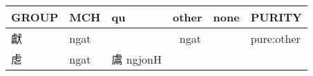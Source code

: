 \documentclass[14pt,a4paper]{scrartcl}
\begin{document}
\begin{longtable}[c]{@{}llllll@{}}
\toprule
\begin{minipage}[b]{0.14\columnwidth}\raggedright\strut
GROUP
\strut\end{minipage} &
\begin{minipage}[b]{0.14\columnwidth}\raggedright\strut
MCH
\strut\end{minipage} &
\begin{minipage}[b]{0.14\columnwidth}\raggedright\strut
qu
\strut\end{minipage} &
\begin{minipage}[b]{0.14\columnwidth}\raggedright\strut
other
\strut\end{minipage} &
\begin{minipage}[b]{0.14\columnwidth}\raggedright\strut
none
\strut\end{minipage} &
\begin{minipage}[b]{0.14\columnwidth}\raggedright\strut
PURITY
\strut\end{minipage}\tabularnewline
\midrule
\endhead
\begin{minipage}[t]{0.14\columnwidth}\raggedright\strut
獻
\strut\end{minipage} &
\begin{minipage}[t]{0.14\columnwidth}\raggedright\strut
ngat
\strut\end{minipage} &
\begin{minipage}[t]{0.14\columnwidth}\raggedright\strut
\strut\end{minipage} &
\begin{minipage}[t]{0.14\columnwidth}\raggedright\strut
𣡌 ngat
\strut\end{minipage} &
\begin{minipage}[t]{0.14\columnwidth}\raggedright\strut
\strut\end{minipage} &
\begin{minipage}[t]{0.14\columnwidth}\raggedright\strut
pure:other
\strut\end{minipage}\tabularnewline
\begin{minipage}[t]{0.14\columnwidth}\raggedright\strut
䖈
\strut\end{minipage} &
\begin{minipage}[t]{0.14\columnwidth}\raggedright\strut
ngat
\strut\end{minipage} &
\begin{minipage}[t]{0.14\columnwidth}\raggedright\strut
鬳 ngjonH
\strut\end{minipage} &
\begin{minipage}[t]{0.14\columnwidth}\raggedright\strut

\end{minipage}
\end{longtable}
\end{document}
